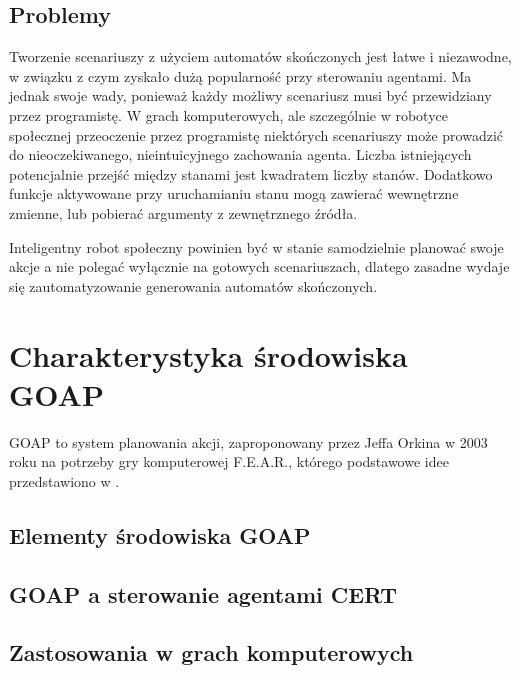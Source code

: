\subsection{Problemy}

Tworzenie scenariuszy z użyciem automatów skończonych jest łatwe i niezawodne, w związku z czym zyskało dużą popularność przy sterowaniu agentami. Ma jednak swoje wady, ponieważ każdy możliwy scenariusz musi być przewidziany przez programistę. W grach komputerowych, ale szczególnie w robotyce społecznej przeoczenie przez programistę niektórych scenariuszy może prowadzić do nieoczekiwanego, nieintuicyjnego zachowania agenta. Liczba istniejących potencjalnie przejść między stanami jest kwadratem liczby stanów. Dodatkowo funkcje aktywowane przy uruchamianiu stanu mogą zawierać wewnętrzne zmienne, lub pobierać argumenty z zewnętrznego źródła. 

Inteligentny robot społeczny powinien być w stanie samodzielnie planować swoje akcje a nie polegać wyłącznie na gotowych scenariuszach, dlatego zasadne wydaje się zautomatyzowanie generowania automatów skończonych.


\section{Charakterystyka środowiska GOAP}


GOAP to system planowania akcji, zaproponowany przez Jeffa Orkina w 2003 roku na potrzeby gry komputerowej F.E.A.R., którego podstawowe idee przedstawiono w \cite{ORKI}. 

\subsection{Elementy środowiska GOAP}




\subsection{GOAP a sterowanie agentami CERT}

\subsection{Zastosowania w grach komputerowych}

